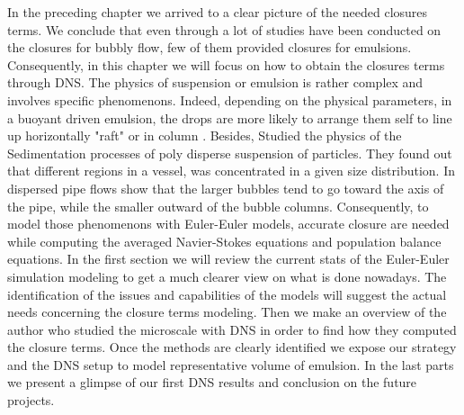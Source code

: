 

In the preceding chapter we arrived to a clear picture of the needed closures terms.
We conclude that even through a lot of studies have been conducted on the closures for bubbly flow, few of them provided closures for emulsions.
Consequently, in this chapter we will focus on how to obtain the closures terms through DNS. 
The physics of suspension or emulsion is rather complex and involves specific phenomenons.
Indeed, depending on the physical parameters, in a buoyant driven emulsion, the drops are more likely to arrange them self to line up horizontally "raft" or in column \citep{tryggvason2011direct} \citep{guazzelli2011}. 
Besides, \citet{davis1985sedimentation} Studied the physics of the Sedimentation processes of poly disperse suspension of particles. 
They found out that different regions in a vessel, was concentrated in a given size distribution.
In dispersed pipe flows \citet{morel2010comparison} show that the larger bubbles tend to go toward the axis of the pipe, while the smaller outward of the bubble columns.
Consequently, to model those phenomenons with Euler-Euler models, accurate closure are needed while computing the averaged Navier-Stokes equations and population balance equations.
In the first section we will review the current stats of the Euler-Euler simulation modeling to get a much clearer view on what is done nowadays.
The identification of the issues and capabilities of the models will suggest the actual needs concerning the closure terms modeling.
Then we make an overview of the author who studied the microscale with DNS in order to find how they computed the closure terms.
Once the methods are clearly identified we expose our strategy and the DNS setup to model representative volume of emulsion. 
In the last parts we present a glimpse of our first DNS results and conclusion on the future projects. 

